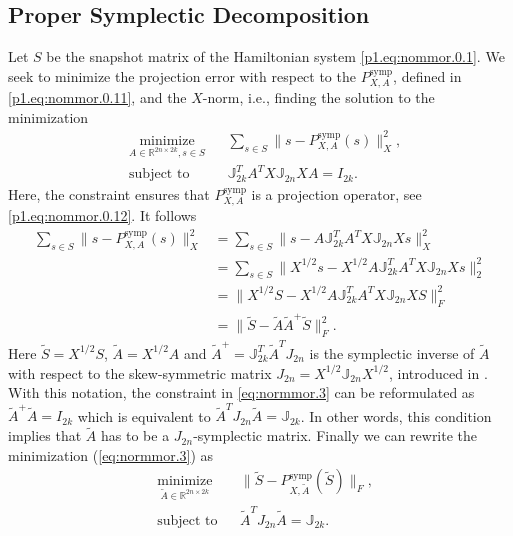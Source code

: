 \subsection{Proper Symplectic Decomposition} \label{sec:normmor.1.1}
Let $S$ be the snapshot matrix of the Hamiltonian system \eqref{p1.eq:nommor.0.1}. We seek to minimize the projection error with respect to the $P_{X,A}^{\text{symp}}$, defined in \eqref{p1.eq:nommor.0.11}, and the $X$-norm, i.e., finding the solution to the minimization
\begin{equation} \label{eq:normmor.3}
\begin{aligned}
& \underset{A\in \mathbb{R}^{2n\times 2k}, s\in S}{\text{minimize}}
& & \sum_{s\in S} \| s - P_{X,A}^{\text{symp}}(s) \|_X^2, \\
& \text{subject to}
& & \mathbb J_{2k}^T A^T X \mathbb J_{2n} X A = I_{2k}.
\end{aligned}
\end{equation}
Here, the constraint ensures that $P_{X,A}^{\text{symp}}$ is a projection operator, see \eqref{p1.eq:nommor.0.12}. It follows
\begin{equation} \label{eq:normmor.4}
\begin{aligned}
	\sum_{s\in S} \| s - P_{X,A}^{\text{symp}}(s) \|_X^2 &= \sum_{s\in S} \| s - A \mathbb J_{2k}^T A^T X \mathbb J_{2n} Xs \|_X^2 \\
	&= \sum_{s\in S} \| X^{1/2}s - X^{1/2} A \mathbb J_{2k}^T A^T X \mathbb J_{2n} X s \|_2^2 \\
	&= \| X^{1/2} S - X^{1/2} A \mathbb J_{2k}^T A^T X \mathbb J_{2n} X S \|_F^2 \\
	&= \| \tilde S - \tilde A \tilde A ^+ \tilde S \|_F^2.
\end{aligned}
\end{equation}
Here $\tilde S = X^{1/2} S$, $\tilde A = X^{1/2} A$ and $\tilde A^+ = \mathbb J_{2k}^T \tilde A^T J_{2n}$ is the symplectic inverse of $\tilde A$ with respect to the skew-symmetric matrix $J_{2n} = X^{1/2} \mathbb J_{2n} X^{1/2}$, introduced in . With this notation, the constraint in \eqref{eq:normmor.3} can be reformulated as $\tilde A ^+ \tilde A = I_{2k}$ which is equivalent to $\tilde A ^T J_{2n} \tilde A = \mathbb J_{2k}$. In other words, this condition implies that $\tilde A$ has to be a $J_{2n}$-symplectic matrix. Finally we can rewrite the minimization (\ref{eq:normmor.3}) as
\begin{equation} \label{eq:normmor.5}
\begin{aligned}
& \underset{\tilde A\in \mathbb{R}^{2n\times 2k}}{\text{minimize}}
& & \| \tilde S - P^\text{symp}_{X,\tilde A}(\tilde S) \|_F, \\
& \text{subject to}
& & \tilde A^T J_{2n} \tilde A = \mathbb J_{2k}.
\end{aligned}
\end{equation}
